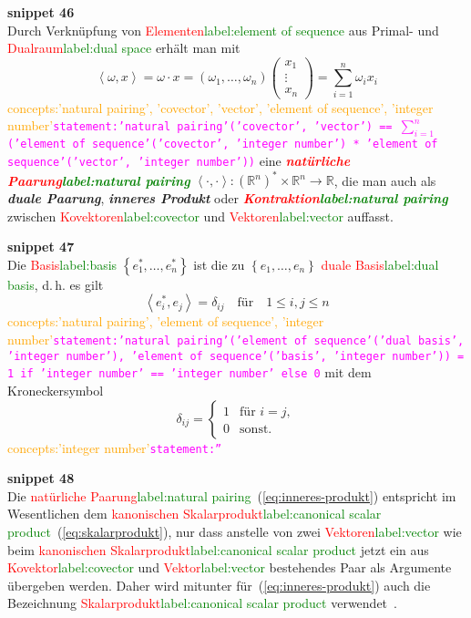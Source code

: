 \documentclass[a4paper,twoside,english,ngerman,deutsch,german,sectrefs,envcountsame,envcountchap]{svmono}
\newcommand{\setref}[2]{\textcolor{red}{#1}\textcolor{green}{#2}}
\newcommand{\snippet}[1]{\textbf{snippet #1}\\}
\newcommand{\eqnote}[2]{\textcolor{orange}{#1}\textcolor{magenta}{\texttt{#2}}}
\begin{document}
\snippet{46}
Durch Verknüpfung von \setref{Elementen}{label:element of sequence} aus Primal- und \setref{Dualraum}{label:dual space} erhält man mit
\begin{equation}
\left\langle \omega,x\right\rangle =\omega\cdot x=\left(\omega_{1},\ldots,\omega_{n}\right)\left(\begin{array}{c}
x_{1}\\
\vdots\\
x_{n}
\end{array}\right)=\sum_{i=1}^{n}\omega_{i}x_{i}\label{eq:inneres-produkt}
\end{equation}\eqnote{concepts:'natural pairing', 'covector', 'vector', 'element of sequence', 'integer number'}{statement:'natural pairing'('covector', 'vector') == $\sum_{i=1}^{n}$ ('element of sequence'('covector', 'integer number') * 'element of sequence'('vector', 'integer number'))}
eine \textbf{\em \setref{natürliche Paarung}{label:natural pairing}}  $\left\langle \cdot,\cdot\right\rangle :({\mathbb{R}}^{n})^{*}\times{\mathbb{R}}^{n}\to{\mathbb{R}}$, die man auch als \textbf{\em duale Paarung}, \textbf{\em inneres Produkt} oder \textbf{\em \setref{Kontraktion}{label:natural pairing}} zwischen \setref{Kovektoren}{label:covector} und \setref{Vektoren}{label:vector} auffasst.

\snippet{47}
Die \setref{Basis}{label:basis} $\left\{ e_{1}^{*},\ldots,e_{n}^{*}\right\} $ ist die zu $\left\{ e_{1},\ldots,e_{n}\right\} $ \setref{duale Basis}{label:dual basis}, d.\,h. es gilt
\[
\left\langle e_{i}^{*},e_{j}\right\rangle =\delta_{ij}\quad\textrm{für}\quad1\leq i,j\leq n
\]\eqnote{concepts:'natural pairing', 'element of sequence', 'integer number'}{statement:'natural pairing'('element of sequence'('dual basis', 'integer number'), 'element of sequence'('basis', 'integer number')) = 1 if 'integer number' == 'integer number' else 0}
mit dem Kroneckersymbol
\[
\delta_{ij}=\left\{ \begin{array}{cl}
1 & \textrm{für }i=j,\\ 0 & \textrm{sonst.}
\end{array}\right.
\]\eqnote{concepts:'integer number'}{statement:''}

\snippet{48}
Die \setref{natürliche Paarung}{label:natural pairing}~(\eqref{eq:inneres-produkt}) entspricht im Wesentlichen dem \setref{kanonischen Skalarprodukt}{label:canonical scalar product}~(\eqref{eq:skalarprodukt}), nur dass anstelle von zwei \setref{Vektoren}{label:vector} wie beim \setref{kanonischen Skalarprodukt}{label:canonical scalar product} jetzt ein aus \setref{Kovektor}{label:covector} und \setref{Vektor}{label:vector} bestehendes Paar als Argumente übergeben werden. Daher wird mitunter für~(\eqref{eq:inneres-produkt}) auch die Bezeichnung
\setref{Skalarprodukt}{label:canonical scalar product} verwendet~\cite{bishop1980}.
\end{document}

